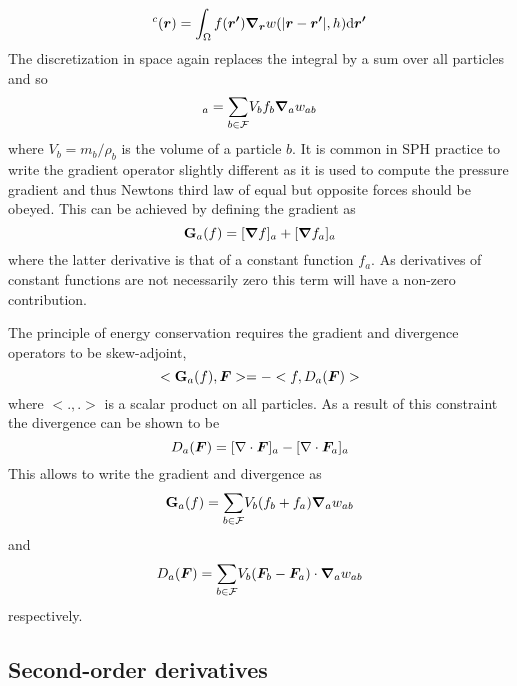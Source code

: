 \begin{equation}
[\vec{\nabla} f]^c(\vec{r}) = \int_\Omega f(\vec{r'}) \vec{\nabla}_{\vec{r}} w(|\vec{r}-\vec{r'}|,h) \td \vec{r'}
\label{e:sph:cint-gradf}
\end{equation}
The discretization in space again replaces the integral by a sum over
all particles and so
\begin{equation}
[\vec{\nabla} f]_a = \sumF V_b f_b \vec{\nabla}_a w_{ab}
\label{e:sph:int-gradf}
\end{equation}
where $V_b = m_b/\rho_b$ is the volume of a particle $b$. It is common
in SPH practice to write the gradient operator slightly different as it
is used to compute the pressure gradient and thus Newtons third law of
equal but opposite forces should be obeyed. This can be achieved by
defining the gradient as
\begin{equation}
\textbf{G}_a(f) = [\bm{\nabla} f]_a + [\bm{\nabla} f_a]_a
\label{e:sph:grad-def}
\end{equation}
where the latter derivative is that of a constant function $f_a$. As
derivatives of constant functions are not necessarily zero this term
will have a non-zero contribution.


The principle of energy conservation requires the gradient and
divergence operators to be skew-adjoint, \ie
\begin{equation}
<\textbf{G}_a(f), \bm{F}> = - <f, D_a(\bm{F})>
\label{e:sph:skew-ajd}
\end{equation}
where $<.,.>$ is a scalar product on all particles. As a result of this
constraint the divergence can be shown to be
\begin{equation}
D_a(\bm{F}) = [\nabla \cdot \bm{F}]_a - [\nabla \cdot \bm{F}_a]_a
\label{e:sph:div-def}
\end{equation}
This allows to write the gradient and divergence as
\begin{equation}
\textbf{G}_a(f) = \underset{b \in \mathcal{F}}{\sum} V_b (f_b + f_a) \bm{\nabla}_a w_{ab}
\label{e:sph:grad}
\end{equation}
and
\begin{equation}
D_a(\bm{F}) = \underset{b \in \mathcal{F}}{\sum} V_b (\bm{F}_b - \bm{F}_a) \cdot \bm{\nabla}_a w_{ab}
\label{e:sph:div}
\end{equation}
respectively.

\subsection{Second-order derivatives}

